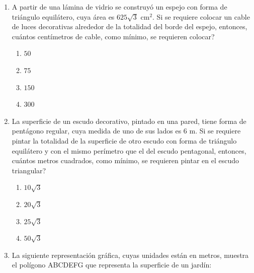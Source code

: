 \documentclass[12pt]{article}
\newcommand{\opcion}[2]{\item $#2$}
\begin{document}
\begin{enumerate}[label=\textbf{\arabic*.}, itemsep=2.5cm]
\Needspace{0.34\textheight}
\item
A partir de una l\'amina de vidrio se construy\'o un espejo con forma de tri\'angulo equil\'atero, cuya \'area es $625\sqrt{3}$ cm$^2$. Si se requiere colocar un cable de luces decorativas alrededor de la totalidad del borde del espejo, entonces, \textquestiondown cu\'antos cent\'imetros de cable, como m\'inimo, se requieren colocar?

\begin{enumerate}[label=\Alph*)]
  \opcion{A}{50}
  \opcion{B}{75}
  \opcion{C}{150}
  \opcion{D}{300}
\end{enumerate}

\Needspace{0.34\textheight}
\item
La superficie de un escudo decorativo, pintado en una pared, tiene forma de pent\'agono regular, cuya medida de uno de sus lados es $6$ m. Si se requiere pintar la totalidad de la superficie de otro escudo con forma de tri\'angulo equil\'atero y con el mismo per\'imetro que el del escudo pentagonal, entonces, \textquestiondown cu\'antos metros cuadrados, como m\'inimo, se requieren pintar en el escudo triangular?

\begin{enumerate}[label=\Alph*)]
  \opcion{A}{10\sqrt{3}}
  \opcion{B}{20\sqrt{3}}
  \opcion{C}{25\sqrt{3}}
  \opcion{D}{50\sqrt{3}}
\end{enumerate}

\Needspace{0.88\textheight}
\item
La siguiente representaci\'on gr\'afica, cuyas unidades est\'an en metros, muestra el pol\'igono ABCDEFG que representa la superficie de un jard\'in:


\end{enumerate}
\end{document}

